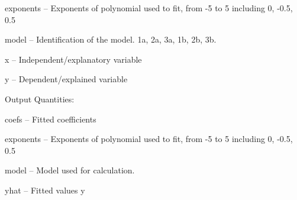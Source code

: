 \begin{tightdesc}
\begin{tightdesc}
        \begin{tightdesc}
            \item[\textsf{exponents}] -- Exponents of polynomial used to fit, from -5 to 5 including 0, -0.5, 0.5
            \item[\textsf{model}] -- Identification of the model. 1a, 2a, 3a, 1b, 2b, 3b.
            \item[\textsf{x}] -- Independent/explanatory variable
            \item[\textsf{y}] -- Dependent/explained variable
        \end{tightdesc}
    \end{tightdesc}
\item [Output Quantities:] \rule{0em}{0em}
    \begin{tightdesc}
        \item[\textsf{coefs}] -- Fitted coefficients
        \item[\textsf{exponents}] -- Exponents of polynomial used to fit, from -5 to 5 including 0, -0.5, 0.5
        \item[\textsf{model}] -- Model used for calculation.
        \item[\textsf{yhat}] -- Fitted values y
    \end{tightdesc}
\end{tightdesc}
